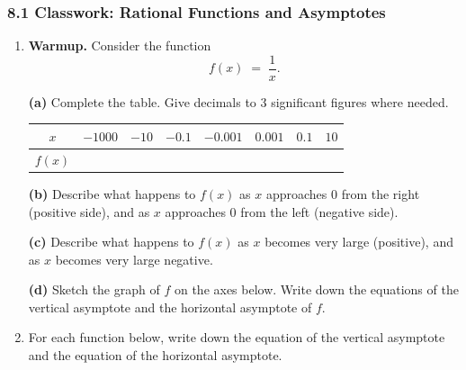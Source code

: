 \documentclass[12pt, twoside]{article}
\begin{document}
\subsubsection*{8.1 Classwork: Rational Functions and Asymptotes}

\begin{enumerate}[itemsep=0.4cm]

\item[1.] \textbf{Warmup.} Consider the function
$$f(x) \;=\; \dfrac{1}{x}.$$

\textbf{(a)} Complete the table. Give decimals to 3 significant figures
where needed.

\vspace{0.2cm}
\begin{center}
\renewcommand{\arraystretch}{1.6}
\begin{tabular}{|c|c|c|c|c|c|c|c|}
\hline
$x$       & $-1000$ & $-10$ & $-0.1$ & $-0.001$ & $0.001$ & $0.1$ & $10$ \\
\hline
$f(x)$    & \phantom{XXXXX} & \phantom{XXXXX} & \phantom{XXXXX} & \phantom{XXXXX} & \phantom{XXXXX} & \phantom{XXXXX} & \phantom{XXXXX} \\
\hline
\end{tabular}
\end{center}
\vspace{0.3cm}

\textbf{(b)} Describe what happens to $f(x)$ as $x$ approaches $0$
from the right (positive side), and as $x$ approaches $0$ from the
left (negative side).

\vspace{2.0cm}

\textbf{(c)} Describe what happens to $f(x)$ as $x$ becomes very
large (positive), and as $x$ becomes very large negative.

\vspace{2.0cm}

\textbf{(d)} Sketch the graph of $f$ on the axes below. Write down the equations of the vertical asymptote and the horizontal asymptote of $f$.

\vspace{1.6cm}

\newpage

\item[2.] For each function below, write down the equation of the
vertical asymptote and the equation of the horizontal asymptote.


\end{enumerate}
\end{document}
